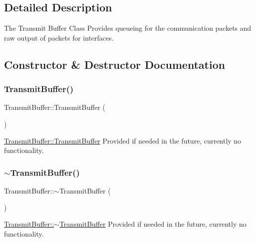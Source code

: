 \subsection{Detailed Description}
The Transmit Buffer Class Provides queueing for the communication packets and raw output of packets for interfaces. 

\subsection{Constructor \& Destructor Documentation}
\hypertarget{class_transmit_buffer_adb5f67b087b5c8d1996f9f7b6fb42341}{}\label{class_transmit_buffer_adb5f67b087b5c8d1996f9f7b6fb42341} 
\subsubsection{\texorpdfstring{Transmit\+Buffer()}{TransmitBuffer()}}
{\footnotesize\ttfamily Transmit\+Buffer\+::\+Transmit\+Buffer (\begin{DoxyParamCaption}{ }\end{DoxyParamCaption})}



\hyperlink{class_transmit_buffer_adb5f67b087b5c8d1996f9f7b6fb42341}{Transmit\+Buffer\+::\+Transmit\+Buffer} Provided if needed in the future, currently no functionality. 

\hypertarget{class_transmit_buffer_a9de4adf2b6fef27e9f35ce3392fb12d2}{}\label{class_transmit_buffer_a9de4adf2b6fef27e9f35ce3392fb12d2} 
\subsubsection{\texorpdfstring{$\sim$\+Transmit\+Buffer()}{~TransmitBuffer()}}
{\footnotesize\ttfamily Transmit\+Buffer\+::$\sim$\+Transmit\+Buffer (\begin{DoxyParamCaption}{ }\end{DoxyParamCaption})}



\hyperlink{class_transmit_buffer_a9de4adf2b6fef27e9f35ce3392fb12d2}{Transmit\+Buffer\+::$\sim$\+Transmit\+Buffer} Provided if needed in the future, currently no functionality. 



